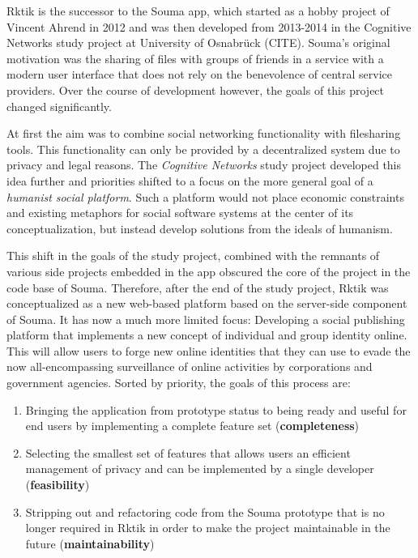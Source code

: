 
Rktik is the successor to the Souma app, which started as a hobby
project of Vincent Ahrend in 2012 and was then developed from 2013-2014
in the Cognitive Networks study project at University of Osnabrück
(CITE). Souma's original motivation was the sharing of files with groups
of friends in a service with a modern user interface that does not rely
on the benevolence of central service providers. Over the course of
development however, the goals of this project changed significantly.

At first the aim was to combine social networking functionality with
filesharing tools. This functionality can only be provided by a
decentralized system due to privacy and legal reasons. The
\emph{Cognitive Networks} study project developed this idea further and
priorities shifted to a focus on the more general goal of a
\emph{humanist social platform}. Such a platform would not place
economic constraints and existing metaphors for social software systems
at the center of its conceptualization, but instead develop solutions
from the ideals of humanism.

This shift in the goals of the study project, combined with the remnants
of various side projects embedded in the app obscured the core of the
project in the code base of Souma. Therefore, after the end of the study
project, Rktik was conceptualized as a new web-based platform based on
the server-side component of Souma. It has now a much more limited
focus: Developing a social publishing platform that implements a new
concept of individual and group identity online. This will allow users
to forge new online identities that they can use to evade the now
all-encompassing surveillance of online activities by corporations and
government agencies. Sorted by priority, the goals of this process are:

\begin{enumerate}
\def\labelenumi{\arabic{enumi}.}
\tightlist
\item
  Bringing the application from prototype status to being ready and
  useful for end users by implementing a complete feature set
  (\textbf{completeness})
\item
  Selecting the smallest set of features that allows users an efficient
  management of privacy and can be implemented by a single developer
  (\textbf{feasibility})
\item
  Stripping out and refactoring code from the Souma prototype that is no
  longer required in Rktik in order to make the project maintainable in
  the future (\textbf{maintainability})
\end{enumerate}

